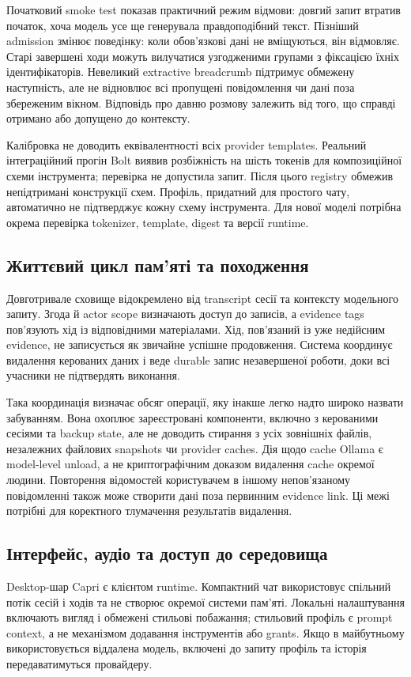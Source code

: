\documentclass[11pt]{article}
\begin{document}
Початковий smoke test показав практичний режим відмови: довгий запит втратив початок, хоча модель усе ще генерувала правдоподібний текст. Пізніший admission змінює поведінку: коли обов'язкові дані не вміщуються, він відмовляє. Старі завершені ходи можуть вилучатися узгодженими групами з фіксацією їхніх ідентифікаторів. Невеликий extractive breadcrumb підтримує обмежену наступність, але не відновлює всі пропущені повідомлення чи дані поза збереженим вікном. Відповідь про давню розмову залежить від того, що справді отримано або допущено до контексту.

Калібровка не доводить еквівалентності всіх provider templates. Реальний інтеграційний прогін Bolt виявив розбіжність на шість токенів для композиційної схеми інструмента; перевірка не допустила запит. Після цього registry обмежив непідтримані конструкції схем. Профіль, придатний для простого чату, автоматично не підтверджує кожну схему інструмента. Для нової моделі потрібна окрема перевірка tokenizer, template, digest та версії runtime.

\subsection{Життєвий цикл пам'яті та походження}
Довготривале сховище відокремлено від transcript сесії та контексту модельного запиту. Згода й actor scope визначають доступ до записів, а evidence tags пов'язують хід із відповідними матеріалами. Хід, пов'язаний із уже недійсним evidence, не записується як звичайне успішне продовження. Система координує видалення керованих даних і веде durable запис незавершеної роботи, доки всі учасники не підтвердять виконання.

Така координація визначає обсяг операції, яку інакше легко надто широко назвати забуванням. Вона охоплює зареєстровані компоненти, включно з керованими сесіями та backup state, але не доводить стирання з усіх зовнішніх файлів, незалежних файлових snapshots чи provider caches. Дія щодо cache Ollama є model-level unload, а не криптографічним доказом видалення cache окремої людини. Повторення відомостей користувачем в іншому непов'язаному повідомленні також може створити дані поза первинним evidence link. Ці межі потрібні для коректного тлумачення результатів видалення.

\subsection{Інтерфейс, аудіо та доступ до середовища}
Desktop-шар Capri є клієнтом runtime. Компактний чат використовує спільний потік сесій і ходів та не створює окремої системи пам'яті. Локальні налаштування включають вигляд і обмежені стильові побажання; стильовий профіль є prompt context, а не механізмом додавання інструментів або grants. Якщо в майбутньому використовується віддалена модель, включені до запиту профіль та історія передаватимуться провайдеру.
\end{document}
